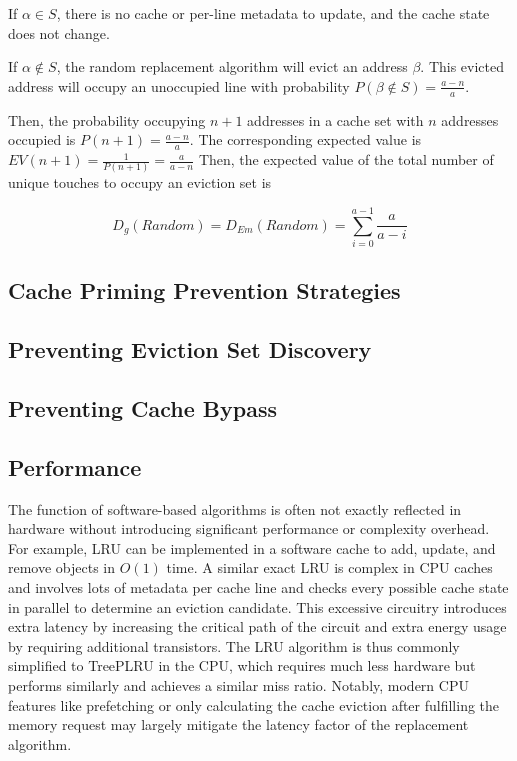 \documentclass[sigconf, screen, review]{acmart}
\begin{document}
If $\alpha \in S$, there is no cache or per-line metadata to update, and the cache state does not change.

If $\alpha \notin S$, the random replacement algorithm will evict an address $\beta$.
This evicted address will occupy an unoccupied line with probability
$P(\beta \notin S) = \frac{a-n}{a}$.

Then, the probability occupying $n+1$ addresses in a cache set with $n$ addresses occupied is $P(n+1) = \frac{a-n}{a}$.
The corresponding expected value is $EV(n+1) = \frac{1}{P(n+1)} = \frac{a}{a-n}$
Then, the expected value of the total number of unique touches to occupy an eviction set is

\begin{equation}\label{RandomExpected}
    D_g(Random) = D_{Em}(Random) = \sum_{i=0}^{a-1}{\frac{a}{a-i}}
\end{equation}

\subsection{Cache Priming Prevention Strategies}

\subsection{Preventing Eviction Set Discovery}

\subsection{Preventing Cache Bypass}

\subsection{Performance}

The function of software-based algorithms is often not exactly reflected in hardware
without introducing significant performance or complexity overhead.
For example, LRU can be implemented in a software cache to add, update, and remove objects
in $O(1)$ time.
A similar exact LRU is complex in CPU caches and involves lots of metadata per cache line
and checks every possible cache state in parallel to determine an eviction candidate.
This excessive circuitry introduces extra latency by increasing the critical path of the circuit
and extra energy usage by requiring additional transistors.
The LRU algorithm is thus commonly simplified to TreePLRU in the CPU, which requires
much less hardware but performs similarly and achieves a similar miss ratio.
Notably, modern CPU features like prefetching or only calculating the cache eviction
after fulfilling the memory request may largely mitigate the latency factor of the
replacement algorithm.
\end{document}

